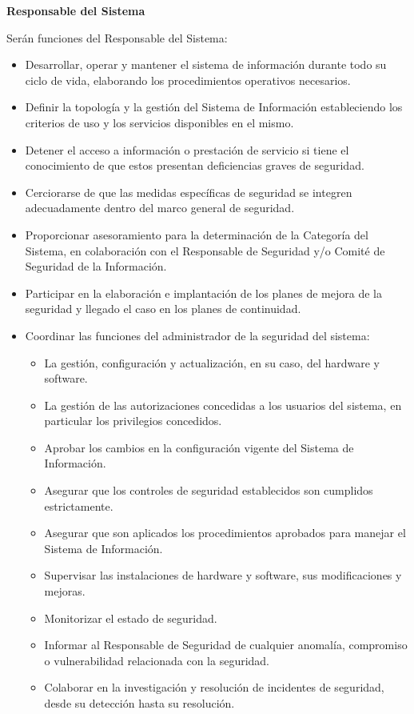 \begin{enumerate}[label=\alph*)]
\textbf{Responsable del Sistema}

Ser\'an funciones del Responsable del Sistema:

\begin{itemize}
  \item Desarrollar, operar y mantener el sistema de informaci\'on durante todo su ciclo de vida, elaborando los procedimientos operativos necesarios.
  \item Definir la topolog\'ia y la gesti\'on del Sistema de Informaci\'on estableciendo los criterios de uso y los servicios disponibles en el mismo.
  \item Detener el acceso a informaci\'on o prestaci\'on de servicio si tiene el conocimiento de que estos presentan deficiencias graves de seguridad.
  \item Cerciorarse de que las medidas espec\'ificas de seguridad se integren adecuadamente dentro del marco general de seguridad.
  \item Proporcionar asesoramiento para la determinaci\'on de la Categor\'ia del Sistema, en colaboraci\'on con el Responsable de Seguridad y/o Comit\'e de Seguridad de la Informaci\'on.
  \item Participar en la elaboraci\'on e implantaci\'on de los planes de mejora de la seguridad y llegado el caso en los planes de continuidad.
  \item Coordinar las funciones del administrador de la seguridad del sistema:
  \begin{itemize}
    \item La gesti\'on, configuraci\'on y actualizaci\'on, en su caso, del hardware y software.
    \item La gesti\'on de las autorizaciones concedidas a los usuarios del sistema, en particular los privilegios concedidos.
    \item Aprobar los cambios en la configuraci\'on vigente del Sistema de Informaci\'on.
    \item Asegurar que los controles de seguridad establecidos son cumplidos estrictamente.
    \item Asegurar que son aplicados los procedimientos aprobados para manejar el Sistema de Informaci\'on.
    \item Supervisar las instalaciones de hardware y software, sus modificaciones y mejoras.
    \item Monitorizar el estado de seguridad.
    \item Informar al Responsable de Seguridad de cualquier anomal\'ia, compromiso o vulnerabilidad relacionada con la seguridad.
    \item Colaborar en la investigaci\'on y resoluci\'on de incidentes de seguridad, desde su detecci\'on hasta su resoluci\'on.
  \end{itemize}
\end{itemize}


\end{enumerate}
